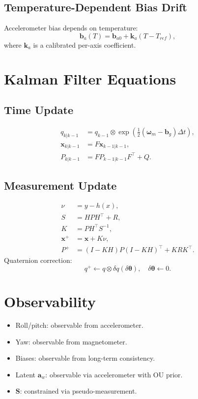 \documentclass[11pt]{article}
\begin{document}
\subsection{Temperature-Dependent Bias Drift}
\label{sec:tempbias}
Accelerometer bias depends on temperature:
\begin{equation}
\bm b_a(T) = \bm b_{a0} + \bm k_a (T - T_{ref}),
\end{equation}
where $\bm k_a$ is a calibrated per-axis coefficient.

\section{Kalman Filter Equations}
\subsection{Time Update}
\begin{align}
q_{k|k-1} &= q_{k-1}\otimes\exp\!\left(\tfrac{1}{2}(\bm\omega_m - \bm b_g)\Delta t\right), \\
\bm x_{k|k-1} &= F \bm x_{k-1|k-1}, \\
P_{k|k-1} &= F P_{k-1|k-1} F^\top + Q.
\end{align}

\subsection{Measurement Update}
\begin{align}
\nu &= y - h(x), \\
S &= HPH^\top + R, \\
K &= PH^\top S^{-1}, \\
\bm x^+ &= \bm x + K\nu, \\
P^+ &= (I-KH)P(I-KH)^\top + KRK^\top.
\end{align}
Quaternion correction:
\begin{equation}
q^+ \leftarrow q \otimes \delta q(\delta\bm\theta), \quad \delta\bm\theta\leftarrow 0.
\end{equation}

\section{Observability}
\begin{itemize}
\item Roll/pitch: observable from accelerometer.
\item Yaw: observable from magnetometer.
\item Biases: observable from long-term consistency.
\item Latent $\bm a_w$: observable via accelerometer with OU prior.
\item $\bm S$: constrained via pseudo-measurement.
\end{itemize}
\end{document}
